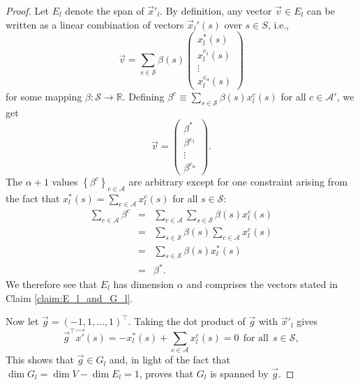 \documentclass{article}
\numberwithin{myclaim}{section}
\newcommand{\set}[1]{\left\{ #1 \right\}}
\begin{document}
\begin{proof}
Let $E_l$ denote the span of $\vec{x}'_l$. By definition, any vector $\vec{v} \in E_l$ can be written as a linear combination of vectors $\vec{x}_l'(s)$ over $s \in S$, i.e.,
\begin{equation}
    \vec{v} = \sum_{s \in \mathcal{S}} \beta(s) 
    \left(
    \begin{array}{c} 
        x^*_l(s) \\
        x^{c_1}_l(s) \\
        \vdots \\
        x^{c_\alpha}_l(s)
    \end{array}
    \right)
\end{equation}
for some mapping $\beta: \mathcal{S} \to \mathbb{R}$. Defining $\beta^c \equiv \sum_{s \in \mathcal{S}} \beta(s) x_l^c(s)$ for all $c \in \mathcal{A'}$, we get
\begin{equation}
    \vec{v} = \left( 
    \begin{array}{c} 
        \beta^* \\
        \beta^{c_1} \\
        \vdots \\
        \beta^{c_\alpha}
    \end{array}
    \right).
\end{equation}
The $\alpha+1$ values $\set{\beta^c}_{c \in \mathcal{A}}$ are arbitrary except for one constraint arising from the fact that $x_l^*(s) = \sum_{c \in \mathcal{A}} x_l^c(s)$ for all $s \in \mathcal{S}$: 
\begin{eqnarray}
    \sum_{c \in \mathcal{A}} \beta^c &=& \sum_{c \in \mathcal{A}} \sum_{s \in \mathcal{S}} \beta(s) x_l^c(s) \\
    &=& \sum_{s \in \mathcal{S}} \beta(s) \sum_{c \in \mathcal{A}}  x_l^c(s) \\
    &=& \sum_{s \in \mathcal{S}} \beta(s) x_l^*(s) \\
    &=& \beta^*.
\end{eqnarray}
We therefore see that $E_l$ has dimension $\alpha$ and comprises the vectors stated in Claim \ref{claim:E_l_and_G_l}. 

Now let $\vec{g} = (-1, 1, \ldots, 1)^\top$. Taking the dot product of $\vec{g}$ with $\vec{x}'_l$ gives
\begin{equation}
    \vec{g}^\top \vec{x'}(s) = - x_l^*(s) + \sum_{c \in \mathcal{A}} x_l^c(s)  = 0~~\textrm{for all}~~s \in \mathcal{S},
\end{equation} 
This shows that $\vec{g} \in G_l$ and, in light of the fact that $\dim G_l = \dim V - \dim E_l = 1$, proves that $G_l$ is spanned by $\vec{g}$.   
\end{proof}
\end{document}
